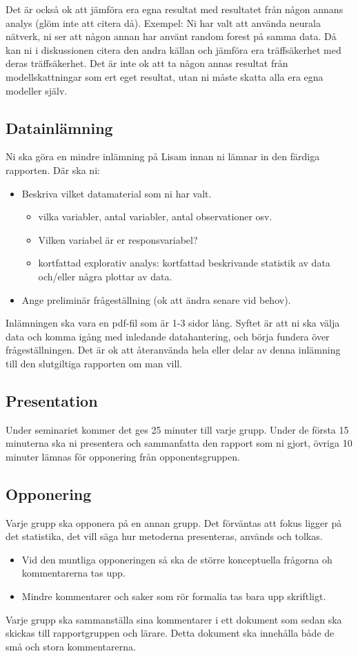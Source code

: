 \documentclass[a4paper]{article}
\begin{document}
Det är också ok att jämföra era egna resultat med resultatet från någon annans analys (glöm inte att citera då). Exempel: Ni har valt att använda neurala nätverk, ni ser att någon annan har använt random forest på samma data. Då kan ni i diskussionen citera den andra källan och jämföra era träffsäkerhet med deras träffsäkerhet. Det är inte ok att ta någon annas resultat från modellskattningar som ert eget resultat, utan ni måste skatta alla era egna modeller själv.

\subsection*{Datainlämning}
Ni ska göra en mindre inlämning på Lisam innan ni lämnar in den färdiga rapporten. Där ska ni:
\begin{itemize}
    \item Beskriva vilket datamaterial som ni har valt.
    \begin{itemize}
        \item vilka variabler, antal variabler, antal observationer osv.
        \item Vilken variabel är er responsvariabel? 
        \item kortfattad explorativ analys: kortfattad beskrivande statistik av data och/eller några plottar av data.
    \end{itemize}
    \item Ange preliminär frågeställning (ok att ändra senare vid behov).
\end{itemize}
Inlämningen ska vara en pdf-fil som är 1-3 sidor lång. Syftet är att ni ska välja data och komma igång med inledande datahantering, och börja fundera över frågeställningen. Det är ok att återanvända hela eller delar av denna inlämning till den slutgiltiga rapporten om man vill.

\subsection*{Presentation}
Under seminariet kommer det ges 25 minuter till varje grupp. Under de första 15 minuterna ska ni presentera och sammanfatta den rapport som ni gjort, övriga 10 minuter lämnas för opponering från opponentsgruppen.

\subsection*{Opponering}
Varje grupp ska opponera på en annan grupp. Det förväntas att fokus ligger på det statistika, det vill säga hur metoderna presenteras, används och tolkas.
\begin{itemize}
    \item Vid den muntliga opponeringen så ska de större konceptuella frågorna oh kommentarerna tas upp.
    \item Mindre kommentarer och saker som rör formalia tas bara upp skriftligt.
\end{itemize}
Varje grupp ska sammanställa sina kommentarer i ett dokument som sedan ska skickas till rapportgruppen och lärare. Detta dokument ska innehålla både de små och stora kommentarerna.
\end{document}
